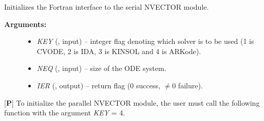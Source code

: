 \documentclass[letterpaper,10pt,english]{sphinxmanual}
\begin{document}
\begin{fulllineitems}
\label{f_interface/Usage:f/_/FNVINITS}
Initializes the Fortran interface to the serial NVECTOR module.
\begin{description}
\item[{\textbf{Arguments:}}] \leavevmode\begin{itemize}
\item {} 
\emph{KEY} (, input) -- integer flag denoting which solver
is to be used (1 is CVODE, 2 is IDA, 3 is KINSOL and 4 is ARKode).

\item {} 
\emph{NEQ} (, input) -- size of the ODE system.

\item {} 
\emph{IER} (, output) -- return flag (0 success, $\ne 0$ failure).

\end{itemize}

\end{description}

\end{fulllineitems}


{[}\textbf{P}{]} To initialize the parallel NVECTOR module, the user must
call the following function with the argument \emph{KEY} = 4.
\end{document}
